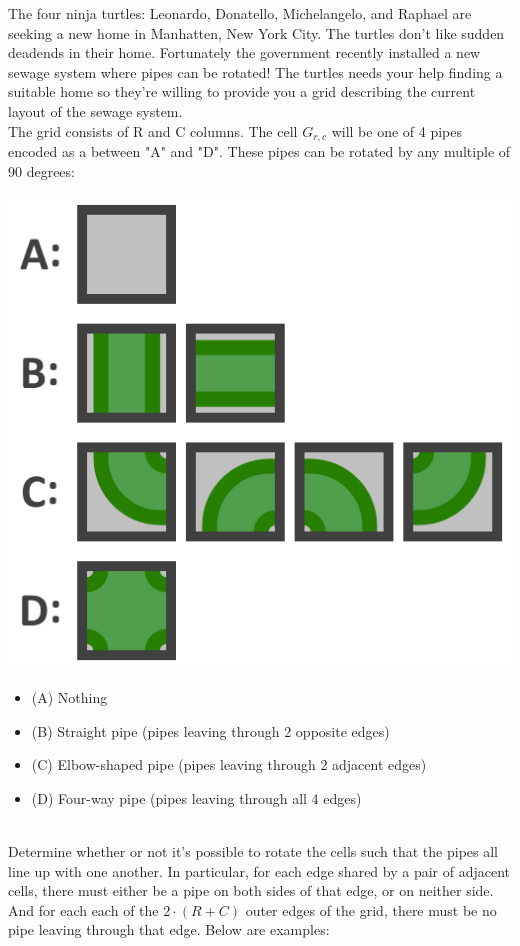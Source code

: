 

\noindent The four ninja turtles:  Leonardo, Donatello, Michelangelo, and Raphael 
are seeking a new home in Manhatten, New York City. The turtles don't like sudden deadends 
in their home. Fortunately the government recently installed a new sewage system where pipes 
can be rotated! The turtles needs your help finding a suitable home so they're willing to provide you a grid 
describing the current layout of the sewage system.  \\

\noindent The grid consists of R and C columns. The cell $G_{r,c}$ will be one of 4 pipes encoded as a 
between "A" and "D". These pipes can be rotated by any multiple 
of 90 degrees: \\

\begin{minipage}{0.4\textwidth}
  \includegraphics[width=.7\textwidth]{pipe_rotation_1.png} 
\end{minipage} \hfill
\begin{minipage}{0.6\textwidth}
  \begin{itemize}
    \item (A) Nothing
    \item (B) Straight pipe (pipes leaving through 2 opposite edges)
    \item (C) Elbow-shaped pipe (pipes leaving through 2 adjacent edges)
    \item (D) Four-way pipe (pipes leaving through all 4 edges) 
  \end{itemize}
\end{minipage} 
\\ 


\noindent Determine whether or not it's possible to rotate the cells such that the pipes all 
line up with one another. In particular, for each edge shared by a pair of adjacent cells, 
there must either be a pipe on both sides of that edge, or on neither side. 
And for each each of the $2 \cdot (R+C)$ outer edges of the grid, there must be no pipe leaving through that edge. Below are examples:


